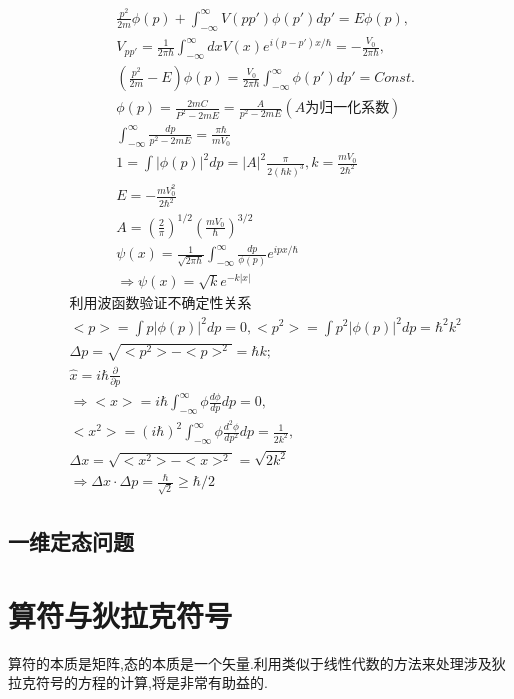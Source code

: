 \documentclass[UTF8,a4paper,10pt]{ctexart}
\begin{document}
\begin{equation}
    \begin{aligned}
&\frac{p^2}{2m}\phi(p)+\int_{-\infty}^{\infty}V(pp')\phi(p')dp'=E\phi(p),\\
&V_{pp'}=\frac{1}{2\pi\hbar}\int_{-\infty}^{\infty}dxV(x)e^{i(p-p')x/\hbar}=-\frac{V_{0}}{2\pi\hbar},\\
&(\frac{p^2}{2m}-E)\phi(p)=\frac{V_{0}}{2\pi\hbar}\int_{-\infty}^{\infty}\phi(p')dp'=\textit{Const.}\\
&\phi(p)=\frac{2mC}{P^2-2mE}=\frac{A}{p^2-2mE}(A\text{为归一化系数})\\
&\int_{-\infty}^{\infty}\frac{dp}{p^2-2mE}=\frac{\pi\hbar}{mV_{0}}\\
&1=\int|\phi(p)|^2dp=|A|^2\frac{\pi}{2(\hbar k)^3},k=\frac{mV_{0}}{2\hbar^2}\\
&E=-\frac{mV_{0}^2}{2\hbar^2}\\
&A=(\frac{2}{\pi})^{1/2}(\frac{mV_{0}}{\hbar})^{3/2}\\
&\psi(x)=\frac{1}{\sqrt{2\pi\hbar}}\int_{-\infty}^{\infty}\frac{dp}{\phi(p)}e^{ipx/\hbar}\\
&\Longrightarrow \psi(x)=\sqrt{k}e^{-k|x|}
\end{aligned}
\end{equation}
\begin{equation}
    \begin{aligned}
        &\text{利用波函数验证不确定性关系}\\
        &<p>=\int p|\phi(p)|^2dp=0,<p^2>=\int p^2|\phi(p)|^2dp=\hbar^2k^2\\
        &\Delta p=\sqrt{<p^2>-<p>^2}=\hbar k;\\
        &\hat{x}=i\hbar\frac{\partial}{\partial p}\\
        &\Longrightarrow <x>=i\hbar\int_{-\infty}^{\infty}\phi\frac{d\phi}{dp}dp=0,\\
        &<x^2>=(i\hbar)^2\int_{-\infty}^{\infty}\phi\frac{d^2\phi}{dp^2}dp=\frac{1}{2k^2},\\
        &\Delta x=\sqrt{<x^2>-<x>^2}=\sqrt{2k^2}\\
        &\Longrightarrow \Delta x \cdot \Delta p =\frac{\hbar}{\sqrt{2}}\geqslant \hbar/2
    \end{aligned}
\end{equation}

\subsection{一维定态问题}
\section{算符与狄拉克符号}
算符的本质是矩阵,态的本质是一个矢量.利用类似于线性代数的方法来处理涉及狄拉克符号的方程的计算,将是非常有助益的.
\end{document}
